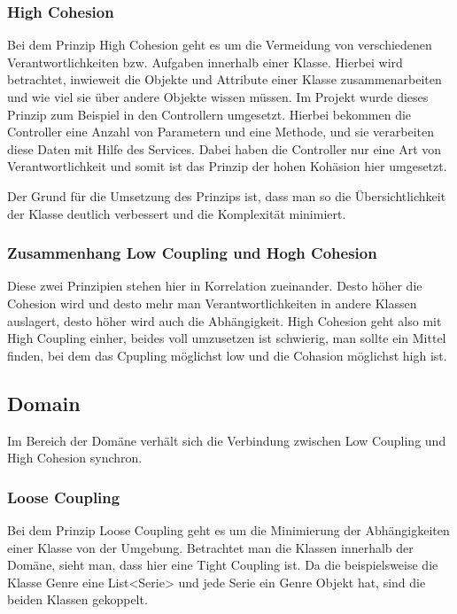         \subsubsection{High Cohesion}
            
            Bei dem Prinzip High Cohesion geht es um die Vermeidung von verschiedenen Verantwortlichkeiten bzw. Aufgaben innerhalb einer Klasse. Hierbei wird betrachtet, inwieweit die Objekte und Attribute einer Klasse zusammenarbeiten und wie viel sie über andere Objekte wissen müssen. Im Projekt wurde dieses Prinzip zum Beispiel in den Controllern umgesetzt. Hierbei bekommen die Controller eine Anzahl von Parametern und eine Methode, und sie verarbeiten diese Daten mit Hilfe des Services. Dabei haben die Controller nur eine Art von Verantwortlichkeit und somit ist das Prinzip der hohen Kohäsion hier umgesetzt.
            
            Der Grund für die Umsetzung des Prinzips ist, dass man so die Übersichtlichkeit der Klasse deutlich verbessert und die Komplexität minimiert.
            
        \subsubsection{Zusammenhang Low Coupling und Hogh Cohesion}
        Diese zwei Prinzipien stehen hier in Korrelation zueinander. Desto höher die Cohesion wird und desto mehr man Verantwortlichkeiten in andere Klassen auslagert, desto höher wird auch die Abhängigkeit. High Cohesion geht also mit High Coupling einher, beides voll umzusetzen ist schwierig, man sollte ein Mittel finden, bei dem das Cpupling möglichst low und die Cohasion möglichst high ist.
    
    \subsection{Domain}
    Im Bereich der Domäne verhält sich die Verbindung zwischen Low Coupling und High Cohesion synchron.

        \subsubsection{Loose Coupling}
        
            Bei dem Prinzip Loose Coupling geht es um die Minimierung der Abhängigkeiten einer Klasse von der Umgebung. Betrachtet man die Klassen innerhalb der Domäne, sieht man, dass hier eine Tight Coupling ist. Da die beispielsweise die Klasse Genre eine List<Serie> und jede Serie ein Genre Objekt hat, sind die beiden Klassen gekoppelt. 
            
